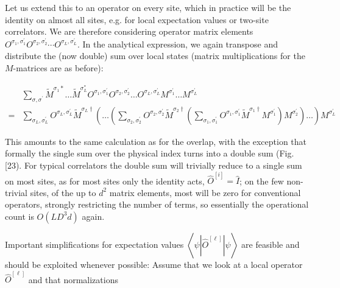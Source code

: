\documentclass[12pt]{article}
\begin{document}
Let us extend this to an operator on every site, which in practice will be the identity on almost all sites, e.g. for local expectation values or two-site correlators. We are therefore considering operator matrix elements $O^{\sigma_{1}, \sigma_{1}^{\prime}} O^{\sigma_{2}, \sigma_{2}^{\prime}} \cdots O^{\sigma_{L}, \sigma_{L}^{\prime}}$. In the analytical expression, we again transpose and distribute the (now double) sum over local states (matrix multiplications for the $M$-matrices are as before):

$$
\begin{aligned}
& \sum_{\sigma, \sigma^{\prime}} \tilde{M}^{\sigma_{1} *} \ldots \tilde{M}^{\sigma_{L}^{*}} O^{\sigma_{1}, \sigma_{1}^{\prime}} O^{\sigma_{2}, \sigma_{2}^{\prime}} \ldots O^{\sigma_{L}, \sigma_{L}^{\prime}} M^{\sigma_{1}^{\prime}} \ldots M^{\sigma_{L}^{\prime}} \\
= & \sum_{\sigma_{L}, \sigma_{L}^{\prime}} O^{\sigma_{L}, \sigma_{L}^{\prime}} \tilde{M}^{\sigma_{L} \dagger}\left(\ldots\left(\sum_{\sigma_{2}, \sigma_{2}^{\prime}} O^{\sigma_{2}, \sigma_{2}^{\prime}} \tilde{M}^{\sigma_{2} \dagger}\left(\sum_{\sigma_{1}, \sigma_{1}^{\prime}} O^{\sigma_{1}, \sigma_{1}^{\prime}} \tilde{M}^{\sigma_{1} \dagger} M^{\sigma_{1}^{\prime}}\right) M^{\sigma_{2}^{\prime}}\right) \ldots\right) M^{\sigma_{L}^{\prime}}
\end{aligned}
$$

This amounts to the same calculation as for the overlap, with the exception that formally the single sum over the physical index turns into a double sum (Fig. [23). For typical correlators the double sum will trivially reduce to a single sum on most sites, as for most sites only the identity acts, $\hat{O}^{[i]}=\hat{I}$; on the few non-trivial sites, of the up to $d^{2}$ matrix elements, most will be zero for conventional operators, strongly restricting the number of terms, so essentially the operational count is $O\left(L D^{3} d\right)$ again.

Important simplifications for expectation values $\left\langle\psi\left|\hat{O}^{[\ell]}\right| \psi\right\rangle$ are feasible and should be exploited whenever possible: Assume that we look at a local operator $\hat{O}^{[\ell]}$ and that normalizations
\end{document}
